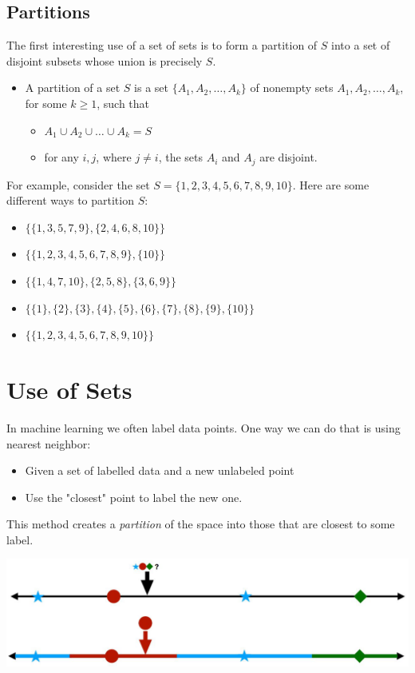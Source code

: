\documentclass[10pt]{article}
\begin{document}
\subsection*{Partitions}
The first interesting use of a set of sets is to form a partition of $S$ into a set of disjoint subsets whose union is precisely $S$.
\begin{itemize}
	\item A partition of a set $S$ is a set $\{A_1, A_2, \dots, A_k\}$ of nonempty sets $A_1, A_2, \dots, A_k$, for some $k \geq 1$, such that 
	\begin{itemize}
	    \item $A_1 \cup A_2 \cup \dots \cup A_k = S$
	    \item for any $i, j$, where $j \neq i$, the sets $A_i$ and $A_j$ are disjoint.
    \end{itemize}
\end{itemize}
For example, consider the set $S = \{1, 2, 3, 4, 5, 6, 7, 8, 9, 10\}$.  Here are some different ways to partition $S$:
\begin{itemize}
	\item $\{\{1, 3, 5, 7, 9\}, \{2, 4, 6, 8, 10\}\}$
	\item $\{\{1, 2, 3, 4, 5, 6, 7, 8, 9\}, \{10\}\}$
	\item $\{\{1, 4, 7, 10\}, \{2, 5, 8\}, \{3, 6, 9\}\}$
	\item $\{\{1\}, \{2\}, \{3\}, \{4\}, \{5\}, \{6\}, \{7\}, \{8\}, \{9\}, \{10\}\}$
	\item $\{\{1, 2, 3, 4, 5, 6, 7, 8, 9, 10\}\}$
\end{itemize}

\section*{Use of Sets}
In machine learning we often label data points.  One way we can do that is using nearest neighbor:
\begin{itemize}
	\item Given a set of labelled data and a new unlabeled point
	\item Use the "closest" point to label the new one.
\end{itemize}
This method creates a \textit{partition} of the space into those that are closest to some label.
\begin{center} 
	\includegraphics*[width=\textwidth]{M2_4.png} 
\end{center}
\end{document}
